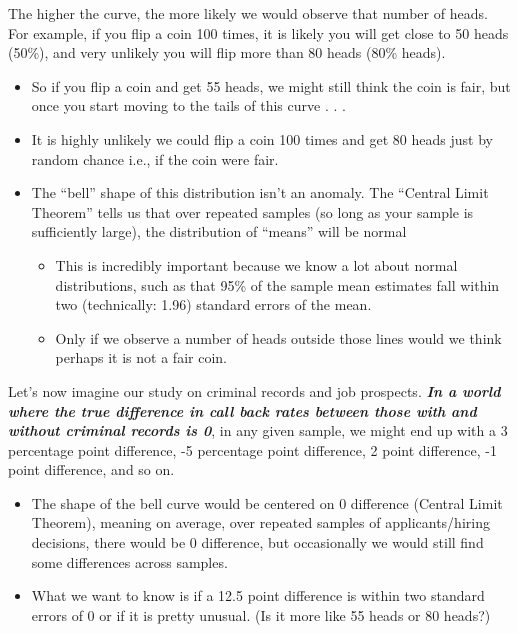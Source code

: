 \documentclass[
  letterpaper,
  DIV=11,
  numbers=noendperiod]{scrreprt}
\providecommand{\tightlist}{%
  \setlength{\itemsep}{0pt}\setlength{\parskip}{0pt}}\usepackage{longtable,booktabs,array}
\begin{document}
The higher the curve, the more likely we would observe that number of
heads. For example, if you flip a coin 100 times, it is likely you will
get close to 50 heads (50\%), and very unlikely you will flip more than
80 heads (80\% heads).

\begin{itemize}
\tightlist
\item
  So if you flip a coin and get 55 heads, we might still think the coin
  is fair, but once you start moving to the tails of this curve . . .
\item
  It is highly unlikely we could flip a coin 100 times and get 80 heads
  just by random chance i.e., if the coin were fair.
\item
  The ``bell'' shape of this distribution isn't an anomaly. The
  ``Central Limit Theorem'' tells us that over repeated samples (so long
  as your sample is sufficiently large), the distribution of ``means''
  will be normal

  \begin{itemize}
  \tightlist
  \item
    This is incredibly important because we know a lot about normal
    distributions, such as that 95\% of the sample mean estimates fall
    within two (technically: 1.96) standard errors of the mean.
  \item
    Only if we observe a number of heads outside those lines would we
    think perhaps it is not a fair coin.
  \end{itemize}
\end{itemize}

Let's now imagine our study on criminal records and job prospects.
\textbf{\emph{In a world where the true difference in call back rates
between those with and without criminal records is 0}}, in any given
sample, we might end up with a 3 percentage point difference, -5
percentage point difference, 2 point difference, -1 point difference,
and so on.

\begin{itemize}
\tightlist
\item
  The shape of the bell curve would be centered on 0 difference (Central
  Limit Theorem), meaning on average, over repeated samples of
  applicants/hiring decisions, there would be 0 difference, but
  occasionally we would still find some differences across samples.
\item
  What we want to know is if a 12.5 point difference is within two
  standard errors of 0 or if it is pretty unusual. (Is it more like 55
  heads or 80 heads?)
\end{itemize}
\end{document}
